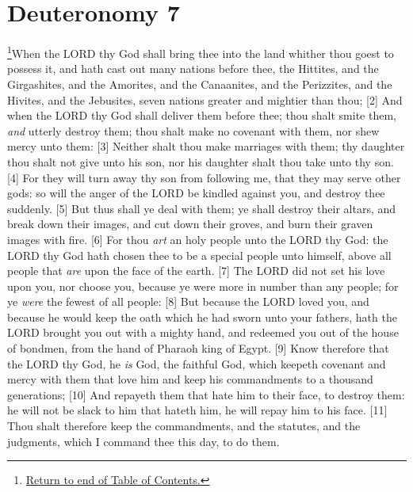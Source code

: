 \chapter{Deuteronomy 7}
\footnote{\textcolor[rgb]{0.00,0.25,0.00}{\hyperlink{DeuteronomyTOC}{Return to end of Table of Contents.}}}\textcolor[rgb]{0.00,0.00,1.00}{When the LORD thy God shall bring thee into the land whither thou goest to possess it, and hath cast out many nations before thee, the Hittites, and the Girgashites, and the Amorites, and the Canaanites, and the Perizzites, and the Hivites, and the Jebusites, seven nations greater and mightier than thou;}
[2] \textcolor[rgb]{0.00,0.00,1.00}{And when the LORD thy God shall deliver them before thee; thou shalt smite them, \emph{and} utterly destroy them; thou shalt make no covenant with them, nor shew mercy unto them:}
[3] \textcolor[rgb]{0.00,0.00,1.00}{Neither shalt thou make marriages with them; thy daughter thou shalt not give unto his son, nor his daughter shalt thou take unto thy son.}
[4] \textcolor[rgb]{0.00,0.00,1.00}{For they will turn away thy son from following me, that they may serve other gods: so will the anger of the LORD be kindled against you, and destroy thee suddenly.}
[5] \textcolor[rgb]{0.00,0.00,1.00}{But thus shall ye deal with them; ye shall destroy their altars, and break down their images, and cut down their groves, and burn their graven images with fire.}
[6] \textcolor[rgb]{0.00,0.00,1.00}{For thou \emph{art} an holy people unto the LORD thy God: the LORD thy God hath chosen thee to be a special people unto himself, above all people that \emph{are} upon the face of the earth.}
[7] \textcolor[rgb]{0.00,0.00,1.00}{The LORD did not set his love upon you, nor choose you, because ye were more in number than any people; for ye \emph{were} the fewest of all people:}
[8] \textcolor[rgb]{0.00,0.00,1.00}{But because the LORD loved you, and because he would keep the oath which he had sworn unto your fathers, hath the LORD brought you out with a mighty hand, and redeemed you out of the house of bondmen, from the hand of Pharaoh king of Egypt.}
[9] \textcolor[rgb]{0.00,0.00,1.00}{Know therefore that the LORD thy God, he \emph{is} God, the faithful God, which keepeth covenant and mercy with them that love him and keep his commandments to a thousand generations;}
[10] \textcolor[rgb]{0.00,0.00,1.00}{And repayeth them that hate him to their face, to destroy them: he will not be slack to him that hateth him, he will repay him to his face.}
[11] \textcolor[rgb]{0.00,0.00,1.00}{Thou shalt therefore keep the commandments, and the statutes, and the judgments, which I command thee this day, to do them.}\\
